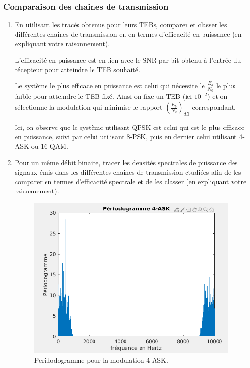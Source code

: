 \documentclass[frenchb]{article}
\begin{document}
\subsubsection{Comparaison des chaines de transmission}
\begin{enumerate}
    \item En utilisant les tracés obtenus pour leurs TEBs, comparer et classer les différentes chaines de transmission en en termes d'efficacité en puissance (en expliquant votre raisonnement).
    
    \setlength\parindent{0.5cm}
    L'efficacité en puissance est en lien avec le SNR par bit obtenu à l'entrée du récepteur pour atteindre le TEB souhaité. 
    
    Le système le plus efficace en puissance est celui qui nécessite le $\frac{E_b}{N_0}$ le plus faible pour atteindre le TEB fixé. Ainsi on fixe un TEB (ici $10^{-2}$) et on sélectionne la modulation qui minimise le rapport $(\frac{E_b}{N_0})_{dB}$ correspondant. 
    
    Ici, on observe que le système utilisant QPSK est celui qui est le plus efficace en puissance, suivi par celui utilisant $8$-PSK, puis en dernier celui utilisant $4$-ASK ou $16$-QAM. 
    \item Pour un même débit binaire, tracer les densités spectrales de puissance des signaux émis dans les différentes chaines de transmission étudiées afin de les comparer en termes d'efficacité spectrale et de les classer (en expliquant votre raisonnement).\\
    
    \begin{figure}[ht!]
    \centering
    \includegraphics[width=12cm]{C34ASKperio.png}
    \caption{Peridodogramme pour la modulation 4-ASK.}
    \label{C35}
 \end{figure}
 

\end{enumerate}
\end{document}
